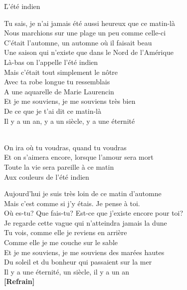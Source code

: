 \documentclass{novel}
\begin{document}
\newpage
\normalsize

\h*{L’été indien}

Tu sais, je n'ai jamais été aussi heureux que ce matin-là \\
Nous marchions sur une plage un peu comme celle-ci \\
C'était l'automne, un automne où il faisait beau \\
Une saison qui n'existe que dans le Nord de l'Amérique \\
Là-bas on l'appelle l'été indien \\
Mais c'était tout simplement le nôtre \\
Avec ta robe longue tu ressemblais \\
A une aquarelle de Marie Laurencin \\
Et je me souviens, je me souviens très bien \\
De ce que je t'ai dit ce matin-là \\
Il y a un an, y a un siècle, y a une éternité \\

\begin{bfseries}
[Refrain:]\\
On ira où tu voudras, quand tu voudras \\
Et on s'aimera encore, lorsque l'amour sera mort \\
Toute la vie sera pareille à ce matin \\
Aux couleurs de l'été indien \\
\end{bfseries}

Aujourd'hui je suis très loin de ce matin d'automne \\
Mais c'est comme si j'y étais. Je pense à toi. \\
Où es-tu? Que fais-tu? Est-ce que j'existe encore pour toi? \\
Je regarde cette vague qui n'atteindra jamais la dune \\
Tu vois, comme elle je reviens en arrière \\
Comme elle je me couche sur le sable \\
Et je me souviens, je me souviens des marées hautes \\
Du soleil et du bonheur qui passaient sur la mer \\
Il y a une éternité, un siècle, il y a un an \\

\textbf{[Refrain]} \\
\end{document}
